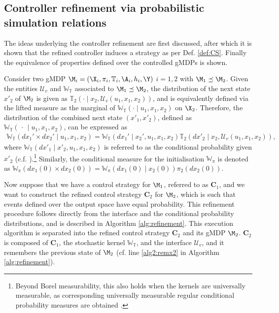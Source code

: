 \documentclass[letterpaper, 10 pt, conference]{amsart}
\theoremstyle{definition}
\theoremstyle{example}
\theoremstyle{remark}
\newcommand{\InF}{\mathcal{U}_{v}}
\newcommand{\C}{{\mathbf{C}}}
\newcommand{\Wt}{\mathbb{W}_{\mathbb{T}}}
\begin{document}
\subsection{Controller refinement via probabilistic simulation relations}\label{sec:refine_exact}

The ideas underlying the controller refinement are first discussed,  
after which it is shown that the refined controller induces a strategy as per Def. \ref{def:CS}. 
Finally the equivalence of properties defined over the controlled gMDPs is shown. 

Consider two gMDP $\M_i=(\X_i,\pi_i,\mathbb T_i,\A_i,h_i,\Y)$ $i=1,2$ with $\M_1\preceq \M_2$.
Given the entities $\InF$ and $\Wt$ associated to $\M_1\preceq \M_2$, 
the distribution of the next state $x'_2$ of $\M_2$ is given as $\mathbb T_2(\cdot\mid  x_2,\InF(u_1,x_1,x_2))$, 
and is equivalently defined via the lifted measure as the marginal of $\Wt(\cdot{\mid} u_1, x_1, x_2)$ on $\X_2$. 
Therefore, the distribution of the combined next state $(x'_1,x'_2)$, 
defined as $\Wt(\,\cdot\,{\mid}u_1,x_1, x_2)$, 
can be expressed as
\begin{align*} 
\Wt(dx_1'\times d x_2'{\mid}  u_1, x_1, x_2)= 
\Wt(d x_1'{\mid} x_2',u_1, x_1, x_2) 
\mathbb T_2(dx'_2{\mid} x_2,\InF( u_1, x_1, x_2)), 
\end{align*}
where $ \Wt(d x'_1{\mid} x'_2,  u_1,  x_1, x_2)$ is referred to as the 
conditional probability given $x'_2$ (c.f. \cite[Corollary 3.1.2]{borkar2012probability}).\footnote{ Beyond Borel measurability, this also holds when the kernels are universally measurable, as corresponding universally measurable regular conditional probability measures are obtained \cite{Edalat1999a}.} Similarly, the conditional measure for the initialisation $\mathbb W_\pi$  
 is denoted as 
$\mathbb W_\pi(d x_{1}(0)\times d x_2(0))=\mathbb W_\pi(d  x_1(0){\mid} x_2(0)) \pi_2 (d x_2(0))$. 

Now suppose that we have a control strategy for $ \M_1$, referred to as ${\mathbf{C}}_1$, and 
we want to construct the refined control strategy $\mathbf{C}_2$ for $\M_2$,  
which is such that  
events defined over the output space have equal probability. 
This refinement procedure follows directly from the interface and the conditional probability distributions, 
and is described in Algorithm \ref{alg:refinement}. 
This execution algorithm is separated into the refined control strategy $\C_2$ and its gMDP $\M_2$. 
$\C_2$ is composed of $\C_1$,  the stochastic kernel $\Wt$, and the interface $\InF$, 
and it remembers the previous state of $\M_2$ (cf. line \ref{alg2:remx2} in Algorithm \ref{alg:refinement}). \smallskip
\end{document}
